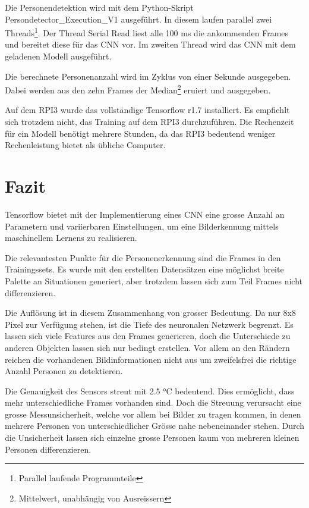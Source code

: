 Die Personendetektion wird mit dem Python-Skript Persondetector\_Execution\_V1 ausgeführt. In diesem laufen parallel zwei Threads\footnote[32]{Parallel laufende Programmteile}. Der Thread Serial Read liest alle 100 ms die ankommenden Frames und bereitet diese für das \ac{CNN} vor. Im zweiten Thread wird das \ac{CNN} mit dem geladenen Modell ausgeführt. 

Die berechnete Personenanzahl wird im Zyklus von einer Sekunde ausgegeben. Dabei werden aus den zehn Frames der Median\footnote[33]{Mittelwert, unabhängig von Ausreissern} eruiert und ausgegeben. 

Auf dem \ac{RPI3} wurde das vollständige Tensorflow r1.7 installiert. Es empfiehlt sich trotzdem nicht, das Training auf dem \ac{RPI3} durchzuführen. Die Rechenzeit für ein Modell benötigt mehrere Stunden, da das \ac{RPI3} bedeutend weniger Rechenleistung bietet als übliche Computer. 

\section{Fazit}

Tensorflow bietet mit der Implementierung eines \ac{CNN} eine grosse Anzahl an Parametern und variierbaren Einstellungen, um eine Bilderkennung mittels maschinellem Lernens zu realisieren. 

Die relevantesten Punkte für die Personenerkennung sind die Frames in den Trainingssets. Es wurde mit den erstellten Datensätzen eine möglichst breite Palette an Situationen generiert, aber trotzdem lassen sich zum Teil Frames nicht differenzieren.

Die Auflösung ist in diesem Zusammenhang von grosser Bedeutung. Da nur 8x8 Pixel zur Verfügung stehen, ist die Tiefe des neuronalen Netzwerk begrenzt. Es lassen sich viele Features aus den Frames generieren, doch die Unterschiede zu anderen Objekten lassen sich nur bedingt erstellen. Vor allem an den Rändern reichen die vorhandenen Bildinformationen nicht aus um zweifelsfrei die richtige Anzahl Personen zu detektieren. 

Die Genauigkeit des Sensors streut mit 2.5 °C bedeutend. Dies ermöglicht, dass mehr unterschiedliche Frames vorhanden sind. Doch die Streuung verursacht eine grosse Messunsicherheit, welche vor allem bei Bilder zu tragen kommen, in denen mehrere Personen von unterschiedlicher Grösse nahe nebeneinander stehen. Durch die Unsicherheit lassen sich einzelne grosse Personen kaum von mehreren kleinen Personen differenzieren.






